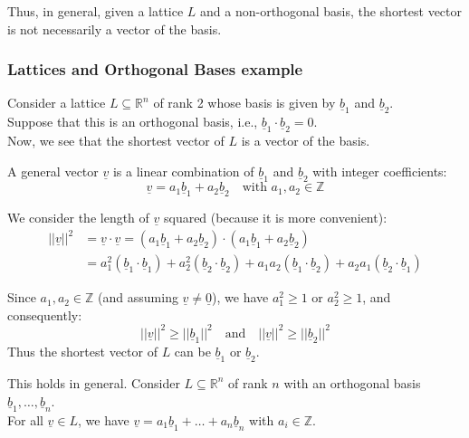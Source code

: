 \noindent
Thus, in general, given a lattice $L$ and a non-orthogonal basis, the shortest vector is not necessarily a vector of the basis.

\subsubsection*{Lattices and Orthogonal Bases example}

Consider a lattice $L \subseteq \mathbb{R}^n$ of rank 2 whose basis is given by $\underline{b}_1$ and $\underline{b}_2$.\\ Suppose that this is an orthogonal basis, i.e., $\underline{b}_1 \cdot \underline{b}_2 = 0$.\\ 
Now, we see that the shortest vector of $L$ is a vector of the basis. 
\medskip

\noindent
A general vector $\underline{v}$ is a linear combination of $\underline{b}_1$ and $\underline{b}_2$ with integer coefficients: 
\[ \underline{v} = a_1\underline{b}_1 + a_2\underline{b}_2 \quad \text{with } a_1, a_2 \in \mathbb{Z} \]
\bigskip

\noindent
We consider the length of $\underline{v}$ squared (because it is more convenient):
\begin{align*}
||\underline{v}||^2 &= \underline{v} \cdot \underline{v} = (a_1\underline{b}_1 + a_2\underline{b}_2) \cdot (a_1\underline{b}_1 + a_2\underline{b}_2) \\
&= a_1^2(\underline{b}_1 \cdot \underline{b}_1) + a_2^2(\underline{b}_2 \cdot \underline{b}_2) + a_1a_2(\underline{b}_1 \cdot \underline{b}_2) + a_2a_1(\underline{b}_2 \cdot \underline{b}_1)
\end{align*}

\vspace{0.5cm}

\noindent
Since $a_1, a_2 \in \mathbb{Z}$ (and assuming $\underline{v} \neq \underline{0}$), we have $a_1^2 \ge 1$ or $a_2^2 \ge 1$, and consequently:
\[ ||\underline{v}||^2 \ge ||\underline{b}_1||^2 \quad \text{and} \quad ||\underline{v}||^2 \ge ||\underline{b}_2||^2 \]
Thus the shortest vector of $L$ can be $\underline{b}_1$ or $\underline{b}_2$.

\bigskip

\noindent
This holds in general. Consider $L \subseteq \mathbb{R}^n$ of rank $n$ with an orthogonal basis $\underline{b}_1, \dots, \underline{b}_n$.\\
For all $\underline{v} \in L$, we have $\underline{v} = a_1\underline{b}_1 + \dots + a_n\underline{b}_n$ with $a_i \in \mathbb{Z}$.

